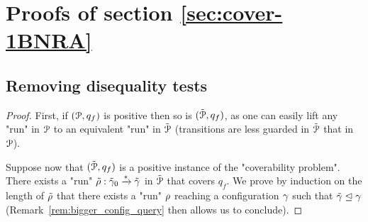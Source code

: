 
\section{Proofs of section \ref{sec:cover-1BNRA}}

\label{app:cover-one-reg}
\subsection{Removing disequality tests}
\label{sec:one-diseq-tests}

\lemRemoveDiseq*

\ifproofs
\begin{proof}
	First, if $(\mathcal{P}, q_f)$ is positive then so is $(\tilde{\mathcal{P}}, q_f)$, as one can easily lift any "run" in $\mathcal{P}$ to an equivalent "run" in $\tilde{\mathcal{P}}$ (transitions are less guarded  in $\tilde{\mathcal{P}}$ that in $\mathcal{P}$). 
	
	Suppose now that $(\tilde{\mathcal{P}}, q_f)$ is a positive instance of the "coverability problem". There exists a "run" $\tilde{\rho}: \tilde{\gamma}_0 \xrightarrow{*} \tilde{\gamma}$ in $\tilde{\mathcal{P}}$ that covers $q_f$. We prove by induction on the length of $\tilde{\rho}$ that there exists a "run" $\rho$ reaching a configuration $\gamma$ such that $\tilde{\gamma} \trianglelefteq \gamma$ (Remark~\ref{rem:bigger_config_query} then allows us to conclude). 
	

\end{proof}
